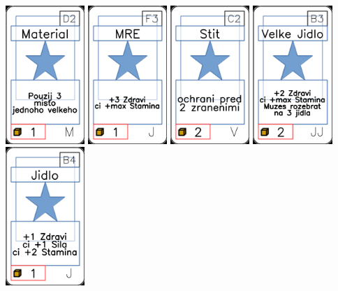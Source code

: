 \documentclass[a4paper]{article}
\begin{document}
	\includegraphics[width=3.0cm]{img-1_46}
	\includegraphics[width=3.0cm]{img-1_27}
	\includegraphics[width=3.0cm]{img-1_71}
	\includegraphics[width=3.0cm]{img-1_37}
	\includegraphics[width=3.0cm]{img-1_8}
\end{document}
